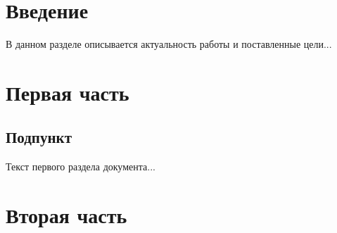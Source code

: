 \documentclass[paper=a4, fontsize=14pt, pagesize, DIV=calc, oneside]{scrreport}
\begin{document}
\pagestyle{empty} 



\newpage
\tableofcontents
\newpage

\pagestyle{plain}
\setcounter{page}{2} 



\chapter*{Введение}



В данном разделе описывается актуальность работы и поставленные цели...



\chapter{Первая часть}




\section{Подпункт}



Текст первого раздела документа...



\chapter{Вторая часть}



\end{document}
